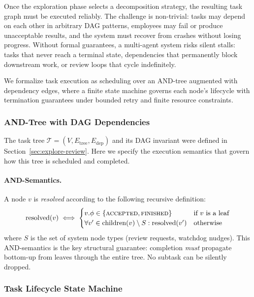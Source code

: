 \documentclass[11pt,a4paper]{article}
\begin{document}
Once the exploration phase selects a decomposition strategy, the resulting task graph must be executed reliably. The challenge is non-trivial: tasks may depend on each other in arbitrary DAG patterns, employees may fail or produce unacceptable results, and the system must recover from crashes without losing progress. Without formal guarantees, a multi-agent system risks silent stalls: tasks that never reach a terminal state, dependencies that permanently block downstream work, or review loops that cycle indefinitely.

We formalize task execution as scheduling over an AND-tree augmented with dependency edges, where a finite state machine governs each node’s lifecycle with termination guarantees under bounded retry and finite resource constraints.

\subsubsection{AND-Tree with DAG Dependencies}

The task tree $\mathcal{T} = (V, E_{\text{tree}}, E_{\text{dep}})$ and its DAG invariant were defined in Section~\ref{sec:explore-review}.  Here we specify the execution semantics that govern how this tree is scheduled and completed.

\paragraph{AND-Semantics.}
A node $v$ is \emph{resolved} according to the following recursive definition:
\begin{equation}
\text{resolved}(v) \iff \begin{cases} v.\phi \in \{\textsc{accepted}, \textsc{finished}\} & \text{if } v \text{ is a leaf} \\ \forall v' \in \text{children}(v) \setminus S : \text{resolved}(v') & \text{otherwise} \end{cases}
\end{equation}
where $S$ is the set of system node types (review requests, watchdog nudges).  This AND-semantics is the key structural guarantee: completion \emph{must} propagate bottom-up from leaves through the entire tree.  No subtask can be silently dropped.

\subsubsection{Task Lifecycle State Machine}
\end{document}
